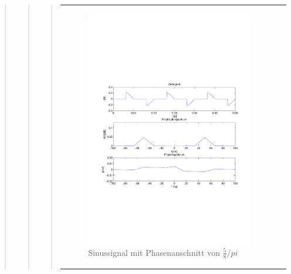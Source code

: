 \begin{quote}
\begin{quote}
\begin{quote}
\begin{center}
\begin{tabular}{ll}
\begin{minipage}{0.6\textwidth}
                    \end{minipage}
                    \begin{minipage}{0.6\textwidth}
    
                       \begin{figure}[H]
                            \label{fig:}
                            \includegraphics[scale=0.5, trim = 2cm 7cm 1.5cm 8.5cm, clip]{./Bilder/Phasenanschnitt58pi.pdf} %
                            \caption{Sinussignal mit Phasenanschnitt von $\frac{5}{8}/pi$}
                        \end{figure}
                     \vspace{-1.5em}
    
                    \end{minipage}
    

\end{tabular}
\end{center}
\end{quote}
\end{quote}
\end{quote}
